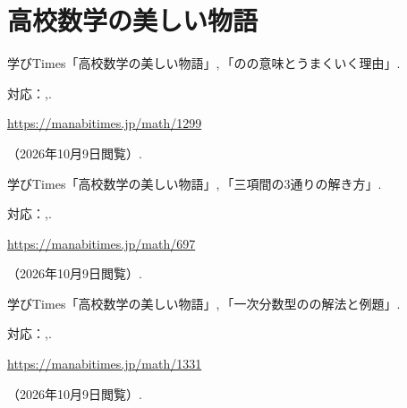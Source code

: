  \section{高校数学の美しい物語}
  \begin{enumerate}[resume,label={[\arabic*]}]
    \item \begin{minipage}[t]{\linewidth}\raggedright
        学びTimes「高校数学の美しい物語」,\,「のの意味とうまくいく理由」.
        \par{\small 対応：,.\par}
        \par\noindent\url{https://manabitimes.jp/math/1299}\par
        \noindent（2026年10月9日閲覧）.
      \end{minipage}\par\smallskip

    \item \begin{minipage}[t]{\linewidth}\raggedright
        学びTimes「高校数学の美しい物語」,\,「三項間の3通りの解き方」.
        \par{\small 対応：,.\par}
        \par\noindent\url{https://manabitimes.jp/math/697}\par
        \noindent（2026年10月9日閲覧）.
      \end{minipage}\par\smallskip

    \item \begin{minipage}[t]{\linewidth}\raggedright
        学びTimes「高校数学の美しい物語」,\,「一次分数型のの解法と例題」.
        \par{\small 対応：,.\par}
        \par\noindent\url{https://manabitimes.jp/math/1331}\par
        \noindent（2026年10月9日閲覧）.
      \end{minipage}\par\smallskip


\end{enumerate}
